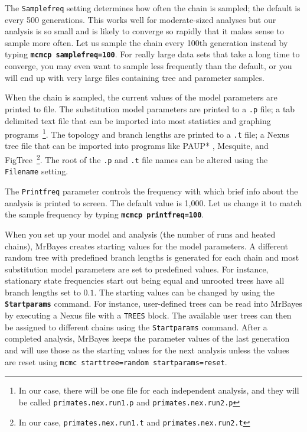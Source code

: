 \documentclass[12pt]{book}
\newcommand{\ttt}[1]{\texttt{#1}}
\newcommand{\tb}[1]{\ttt{\textbf{#1}}}
\begin{document}
The \texttt{Samplefreq} setting determines how often the chain is sampled; the default is every 500
generations. This works well for moderate-sized analyses but our analysis is so small and is likely
to converge so rapidly that it makes sense to sample more often. Let us sample the chain every
100th generation instead by typing \tb{mcmcp samplefreq=100}. For really large data sets that take
a long time to converge, you may even want to sample less frequently than the default, or you will
end up with very large files containing tree and parameter samples.

When the chain is sampled, the current values of the model parameters are printed to file. The
substitution model parameters are printed to a \texttt{.p} file; a tab delimited text file that can
be imported into most statistics and graphing programs~\footnote{In our case, there will be one
file for each independent analysis, and they will be called \texttt{primates.nex.run1.p} and
\texttt{primates.nex.run2.p}}. The topology and branch lengths are printed to a \texttt{.t} file; a
Nexus tree file that can be imported into programs like PAUP* \citep{swofford98}, Mesquite, and
FigTree~\footnote{In our case, \texttt{primates.nex.run1.t} and \texttt{primates.nex.run2.t}}. The
root of the \texttt{.p} and \texttt{.t} file names can be altered using the \texttt{Filename}
setting.

The \texttt{Printfreq} parameter controls the frequency with which brief info about the analysis is
printed to screen. The default value is 1,000. Let us change it to match the sample frequency by
typing \tb{mcmcp printfreq=100}.

When you set up your model and analysis (the number of runs and heated chains), MrBayes creates
starting values for the model parameters. A different random tree with predefined branch lengths is
generated for each chain and most substitution model parameters are set to predefined values. For
instance, stationary state frequencies start out being equal and unrooted trees have all branch
lengths set to $0.1$. The starting values can be changed by using the \tb{Startparams} command.
For instance, user-defined trees can be read into MrBayes by executing a Nexus file with a
\texttt{TREES} block. The available user trees can then be assigned to different chains using the
\texttt{Startparams} command. After a completed analysis, MrBayes keeps the parameter values of the
last generation and will use those as the starting values for the next analysis unless the values
are reset using \texttt{mcmc starttree=random startparams=reset}.
\end{document}
